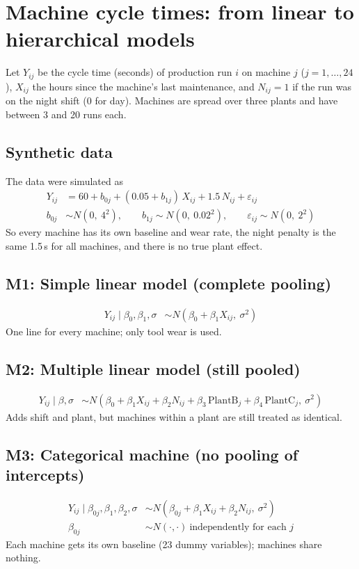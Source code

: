 \documentclass{article}
\begin{document}
\section*{Machine cycle times: from linear to hierarchical models}

Let $Y_{ij}$ be the cycle time (seconds) of production run $i$ on machine $j$
($j=1,\dots,24$), $X_{ij}$ the hours since the machine's last maintenance, and
$N_{ij}=1$ if the run was on the night shift (0 for day). Machines are spread
over three plants and have between 3 and 20 runs each.

\subsection*{Synthetic data}
The data were simulated as
\begin{align*}
Y_{ij} &= 60 + b_{0j} + (0.05 + b_{1j})\,X_{ij} + 1.5\,N_{ij} + \varepsilon_{ij}\\
b_{0j} &\sim N(0,\ 4^2), \qquad b_{1j} \sim N(0,\ 0.02^2), \qquad
\varepsilon_{ij} \sim N(0,\ 2^2)
\end{align*}
So every machine has its own baseline and wear rate, the night penalty is
the same 1.5\,s for all machines, and there is no true plant effect.

\subsection*{M1: Simple linear model (complete pooling)}
\begin{align*}
Y_{ij} \mid \beta_0,\beta_1,\sigma &\sim N(\beta_0 + \beta_1 X_{ij},\ \sigma^2)
\end{align*}
One line for every machine; only tool wear is used.

\subsection*{M2: Multiple linear model (still pooled)}
\begin{align*}
Y_{ij} \mid \beta,\sigma &\sim N(\beta_0 + \beta_1 X_{ij} + \beta_2 N_{ij}
  + \beta_3\,\text{PlantB}_j + \beta_4\,\text{PlantC}_j,\ \sigma^2)
\end{align*}
Adds shift and plant, but machines within a plant are still treated as identical.

\subsection*{M3: Categorical machine (no pooling of intercepts)}
\begin{align*}
Y_{ij} \mid \beta_{0j},\beta_1,\beta_2,\sigma &\sim
  N(\beta_{0j} + \beta_1 X_{ij} + \beta_2 N_{ij},\ \sigma^2)\\
\beta_{0j} &\sim N(\cdot,\cdot) \ \text{independently for each } j
\end{align*}
Each machine gets its own baseline (23 dummy variables); machines share nothing.
\end{document}
